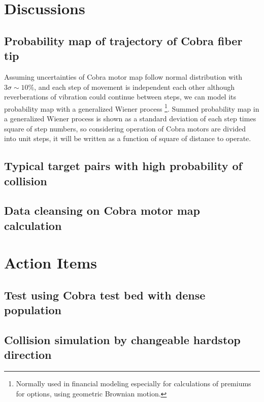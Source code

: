 \documentclass[a4paper,notitlepage]{article}
\begin{document}
\section{Discussions}

\subsection{Probability map of trajectory of Cobra fiber tip}

Assuming uncertainties of Cobra motor map follow normal distribution with 
$3\sigma\sim 10\%$, and each step of movement is independent each other 
although reverberations of vibration could continue between steps, we can 
model its probability map with a generalized Wiener process
\footnote{Normally used in financial modeling especially for calculations of 
premiums for options, using geometric Brownian motion.}.
Summed probability map in a generalized Wiener process is shown as a standard 
deviation of each step times square of step numbers, so considering operation 
of Cobra motors are divided into unit steps, it will be written as a function 
of square of distance to operate. 


\subsection{Typical target pairs with high probability of collision}


\subsection{Data cleansing on Cobra motor map calculation}



\section{Action Items}

\subsection{Test using Cobra test bed with dense population}

\subsection{Collision simulation by changeable hardstop direction}
\end{document}
